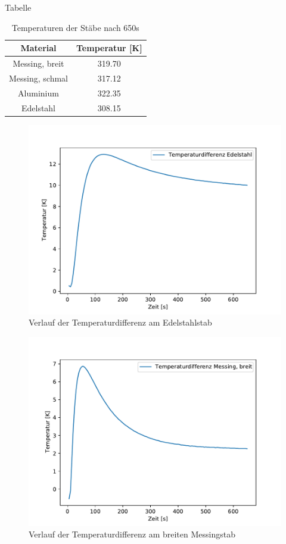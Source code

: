 Tabelle
\begin{table}[H]
  \centering
  \caption{Temperaturen der Stäbe nach 650s}
  \label{tab:650s}
  \begin{tabular}{S S[table-format=3.2]}
    \toprule
    {Material} & {Temperatur [K]}\\
    \midrule
    Messing, breit & 319.70\\
    Messing, schmal & 317.12\\
    Aluminium & 322.35\\
    Edelstahl & 308.15\\
    \bottomrule
  \end{tabular}
\end{table}

\begin{figure}[!htbp]
  \centering
  \includegraphics{differenz_edel.pdf}
  \caption{Verlauf der Temperaturdifferenz am Edelstahlstab}
  \label{fig:diff_edel}
\end{figure}

\begin{figure}[!htbp]
  \centering
  \includegraphics{differenz_mess.pdf}
  \caption{Verlauf der Temperaturdifferenz am breiten Messingstab}
  \label{fig:diff_mess}
\end{figure}

